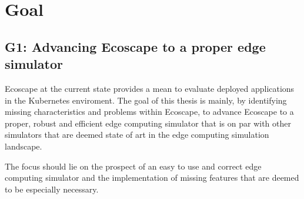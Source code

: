 \chapter{Goal}
\section{G1: Advancing Ecoscape to a proper edge simulator}
Ecoscape at the current state provides a mean to evaluate deployed applications in the Kubernetes enviroment.
The goal of this thesis is mainly, by identifying missing characteristics and problems within Ecoscape, to advance Ecoscape to a proper, robust and efficient edge computing simulator that
is on par with other simulators that are deemed state of art in the edge computing simulation landscape.



The focus should lie on the prospect of an easy to use and correct edge computing simulator and the implementation of missing features that are deemed to be especially necessary.

